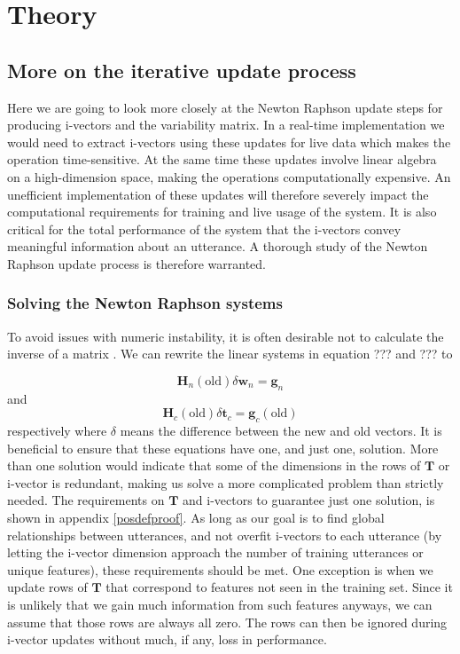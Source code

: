 \chapter{Theory}
\label{sect:Theory}

\section{More on the iterative update process}

Here we are going to look more closely at the Newton Raphson update steps for producing i-vectors and the variability matrix. In a real-time implementation we would need to extract i-vectors using these updates for live data which makes the operation time-sensitive. At the same time these updates involve linear algebra on a high-dimension space, making the operations computationally expensive. An unefficient implementation of these updates will therefore severely impact the computational requirements for training and live usage of the system. It is also critical for the total performance of the system that the i-vectors convey meaningful information about an utterance. A thorough study of the Newton Raphson update process is therefore warranted. 

\subsection{Solving the Newton Raphson systems}

To avoid issues with numeric instability, it is often desirable not to calculate the inverse of a matrix \cite[p. 743]{cormen}. We can rewrite the linear systems in equation ??? and ??? to

\begin{equation}\label{lupeqN}
\mathbf{H}_n(\text{old}) \delta\mathbf{w}_n = \mathbf{g}_n
\end{equation}
and
\begin{equation}\label{lupeqC}
\mathbf{H}_c(\text{old}) \delta \mathbf{t}_c = \mathbf{g}_c(\text{old})
\end{equation}
respectively where $\delta$ means the difference between the new and old vectors. It is beneficial to ensure that these equations have one, and just one, solution. More than one solution would indicate that some of the dimensions in the rows of $\mathbf{T}$ or i-vector is redundant, making us solve a more complicated problem than strictly needed. The requirements on $\mathbf{T}$ and i-vectors to guarantee just one solution, is shown in appendix \ref{posdefproof}. As long as our goal is to find global relationships between utterances, and not overfit i-vectors to each utterance (by letting the i-vector dimension approach the number of training utterances or unique features), these requirements should be met. One exception is when we update rows of $\mathbf{T}$ that correspond to features not seen in the training set. Since it is unlikely that we gain much information from such features anyways, we can assume that those rows are always all zero. The rows can then be ignored during i-vector updates without much, if any, loss in performance.

